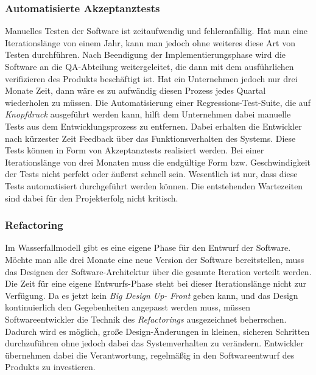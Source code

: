 \subsubsection{Automatisierte Akzeptanztests}
\label{minisec:automatisierte-akzeptanztests}
Manuelles Testen der Software ist zeitaufwendig und fehleranfällig. Hat man
eine Iterationslänge von einem Jahr, kann man jedoch ohne weiteres diese Art
von Testen durchführen. Nach Beendigung der Implementierungsphase wird die
Software an die QA-Abteilung weitergeleitet, die dann mit dem ausführlichen
verifizieren des Produkts beschäftigt ist. Hat ein Unternehmen jedoch nur drei
Monate Zeit, dann wäre es zu aufwändig diesen Prozess jedes Quartal
wiederholen zu müssen. Die Automatisierung einer Regressions-Test-Suite, die
auf \emph{Knopfdruck} ausgeführt werden kann, hilft dem Unternehmen dabei
manuelle Tests aus dem Entwicklungsprozess zu entfernen. Dabei erhalten die
Entwickler nach kürzester Zeit Feedback über das Funktionsverhalten des
Systems. Diese Tests können in Form von Akzeptanztests realisiert werden. Bei
einer Iterationslänge von drei Monaten muss die endgültige Form bzw.
Geschwindigkeit der Tests nicht perfekt oder äußerst schnell sein. Wesentlich
ist nur, dass diese Tests automatisiert durchgeführt werden können. Die
entstehenden Wartezeiten sind dabei für den Projekterfolg nicht kritisch.

\subsubsection{Refactoring}
\label{minisec:refactoring}
Im Wasserfallmodell gibt es eine eigene Phase für den Entwurf der Software.
Möchte man alle drei Monate eine neue Version der Software bereitstellen, muss
das Designen der Software-Architektur über die gesamte Iteration verteilt
werden. Die Zeit für eine eigene Entwurfs-Phase steht bei dieser
Iterationslänge nicht zur Verfügung. Da es jetzt kein \emph{Big Design Up-
Front} geben kann, und das Design kontinuierlich den Gegebenheiten angepasst
werden muss, müssen Softwareentwickler die Technik des \emph{Refactorings}
ausgezeichnet beherrschen. Dadurch wird es möglich, große Design-Änderungen in
kleinen, sicheren Schritten durchzuführen ohne jedoch dabei das
Systemverhalten zu verändern. Entwickler übernehmen dabei die Verantwortung,
regelmäßig in den Softwareentwurf des Produkts zu investieren.

